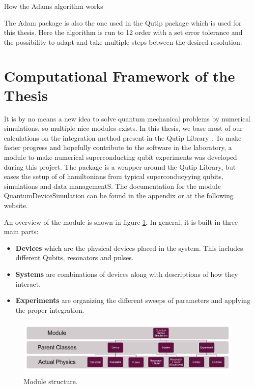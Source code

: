 \begin{marginfigure}
    \centering
    \caption{How the Adams algorithm works}
    \label{fig:Adams integration}
\end{marginfigure}

The Adam package is also the one used in the Qutip package which is used for this thesis. Here the algorithm is run to 12 order with a set error tolerance and the possibility to adapt and take multiple steps between the desired resolution.

\section{Computational Framework of the Thesis}
It is by no means a new idea to solve quantum mechanical problems by numerical simulations, so multiple nice modules exists. In this thesis, we base most of our calculations on the integration method present in the Qutip Library . To make faster progress and hopefully contribute to the software in the laboratory, a module to make numerical superconducting qubit experiments was developed during this project. The package is a wrapper around the Qutip Library, but eases the setup of of hamiltonians from typical superconducyying qubits, simulations and data managementS. The documentation for the module QuantumDeviceSimulation can be found in the appendix or at the following website. 

An overview of the module is shown in figure \ref{fig:module_overview}. In general, it is built in three main parts:
\begin{itemize}
    \item \textbf{Devices} which are the physical devices placed in the system. This includes different Qubits, resonators and pulses.
    \item \textbf{Systems} are combinations of devices along with descriptions of how they interact.
    \item \textbf{Experiments} are organizing the different sweeps of parameters and applying the proper integration. 
\end{itemize}

\begin{figure}
    \centering
    \includegraphics{Figs/Sections/Introduction/module.png}
    \caption{Module structure.}
    \label{fig:module_overview}
\end{figure}
